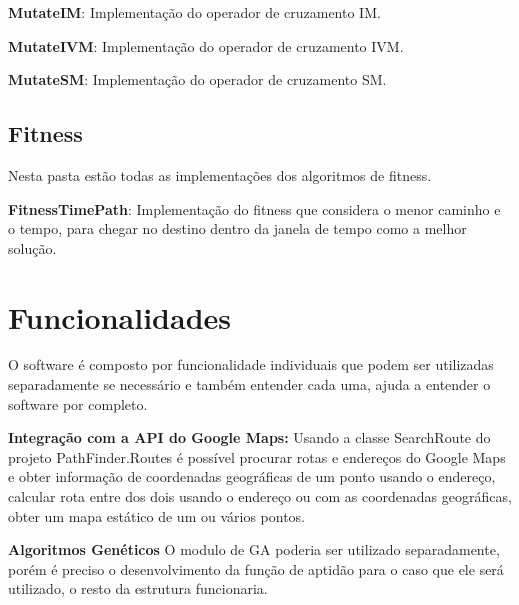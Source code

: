 \textbf{MutateIM}: Implementação do operador de cruzamento IM.

\textbf{MutateIVM}: Implementação do operador de cruzamento IVM.

\textbf{MutateSM}: Implementação do operador de cruzamento SM.

\subsection{Fitness}

Nesta pasta estão todas as implementações dos algoritmos de fitness.

\textbf{FitnessTimePath}: Implementação do fitness que considera o menor caminho e o tempo, para chegar no destino dentro da janela de tempo como a melhor solução.

\section{Funcionalidades}
O software é composto por funcionalidade individuais que podem ser utilizadas separadamente se necessário e também entender cada uma, ajuda a entender o software por completo.

\textbf{Integração com a API do Google Maps:} Usando a classe SearchRoute do projeto PathFinder.Routes é possível procurar rotas e endereços do Google Maps e obter informação de coordenadas geográficas de um ponto usando o endereço, calcular rota entre dos dois usando o endereço ou com as coordenadas geográficas, obter um mapa estático de um ou vários pontos.


\textbf{Algoritmos Genéticos} O modulo de GA poderia ser utilizado separadamente, porém é preciso o desenvolvimento da função de aptidão para o caso que ele será utilizado, o resto da estrutura funcionaria.